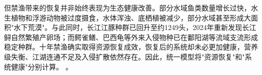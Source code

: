 但禁渔带来的恢复并非始终表现为生态健康改善。部分水域鱼类数量增长过快，水生植物和浮游动物被过度摄食，水体浑浊、底栖植被减少，部分水域甚至形成大面积"水下荒漠"。与此同时，长江江豚种群已回升至约1249头，2024年重新发现长江鲟自然繁殖产卵场；而鳄雀鳝、巴西龟等外来入侵物种已在鄱阳湖等流域支流形成稳定种群。十年禁渔确实取得资源恢复成效，恢复后的系统却未必更加健康，营养级失衡、江湖连通不足及入侵扩散依然存在。因此，统一模型将"资源恢复"和"系统健康"分别计算。
\cite{report2022,report2023}。
